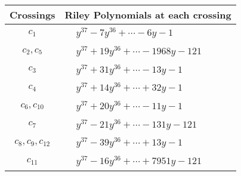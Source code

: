 \documentclass[1p]{elsarticle_modified}
\theoremstyle{definition}
\begin{document}
\begin{tabular}{m{50pt}|m{274pt}}
Crossings & \hspace{64pt}Riley Polynomials at each crossing \\
\hline $$\begin{aligned}c_{1}\end{aligned}$$&$\begin{aligned}
&y^{37}-7 y^{36}+\cdots-6 y-1
\end{aligned}$\\
\hline $$\begin{aligned}c_{2},c_{5}\end{aligned}$$&$\begin{aligned}
&y^{37}+19 y^{36}+\cdots-1968 y-121
\end{aligned}$\\
\hline $$\begin{aligned}c_{3}\end{aligned}$$&$\begin{aligned}
&y^{37}+31 y^{36}+\cdots-13 y-1
\end{aligned}$\\
\hline $$\begin{aligned}c_{4}\end{aligned}$$&$\begin{aligned}
&y^{37}+14 y^{36}+\cdots+32 y-1
\end{aligned}$\\
\hline $$\begin{aligned}c_{6},c_{10}\end{aligned}$$&$\begin{aligned}
&y^{37}+20 y^{36}+\cdots-11 y-1
\end{aligned}$\\
\hline $$\begin{aligned}c_{7}\end{aligned}$$&$\begin{aligned}
&y^{37}-21 y^{36}+\cdots-131 y-121
\end{aligned}$\\
\hline $$\begin{aligned}c_{8},c_{9},c_{12}\end{aligned}$$&$\begin{aligned}
&y^{37}-39 y^{36}+\cdots+13 y-1
\end{aligned}$\\
\hline $$\begin{aligned}c_{11}\end{aligned}$$&$\begin{aligned}
&y^{37}-16 y^{36}+\cdots+7951 y-121
\end{aligned}$\\
\hline
\end{tabular}\\~\\
\end{document}
